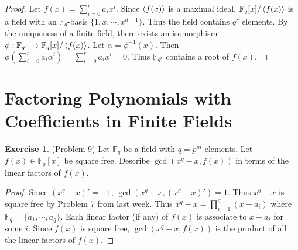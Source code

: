 \documentclass[12pt, psamsfonts]{amsart}
\theoremstyle{definition}
\newtheorem*{exer}{Exercise}
\theoremstyle{remark}
\numberwithin{equation}{section}
\begin{document}
\begin{proof}
  Let $f(x) = \sum_{i=0}^{r} a_ix^i$.
  Since $\ev{f(x)}$ is a maximal ideal, $\mathbb{F}_q[x]/\ev{f(x)}$ is a field with an $\mathbb{F}_q$-basis $\{ 1, x, \cdots, x^{d - 1} \}$.
  Thus the field contains $q^r$ elements.
  By the uniqueness of a finite field, there exists an isomorphism $\phi: \mathbb{F}_{q^r} \rightarrow \mathbb{F}_q[x]/\ev{f(x)}$.
  Let $\alpha = \phi^{-1}(x)$.
  Then $\phi(\sum_{i=0}^{r} a_i\alpha^i) = \sum_{i=0}^{r}a_ix^i = 0$.
  Thus $\mathbb{F}_{q^r}$ contains a root of $f(x)$.
\end{proof}

\section{Factoring Polynomials with Coefficients in Finite Fields}

\begin{exer}{(Problem 9)}
  Let $\mathbb{F}_q$ be a field with $q = p^m$ elements.
  Let $f(x) \in \mathbb{F}_q[x]$ be square free.
  Describe $\gcd(x^q - x, f(x))$ in terms of the linear factors of $f(x)$.
\end{exer}

\begin{proof}
  Since $(x^q - x)' = -1$, $\gcd(x^q - x, (x^q - x)') = 1$.
  Thus $x^q - x$ is square free by Problem 7 from last week.
  Thus $x^q - x = \prod_{i=1}^{q} (x - a_i)$ where $\mathbb{F}_q = \{ a_1, \cdots, a_q \}$.
  Each linear factor (if any) of $f(x)$ is associate to $x - a_i$ for some $i$.
  Since $f(x)$ is square free, $\gcd(x^q - x, f(x))$ is the product of all the linear factors of $f(x)$.
\end{proof}
\end{document}
